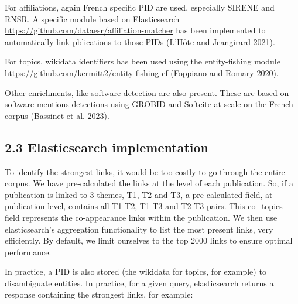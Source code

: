 \documentclass[
]{article}
\begin{document}
For affiliations, again French specific PID are used, especially SIRENE
and RNSR. A specific module based on Elasticsearch
\url{https://github.com/dataesr/affiliation-matcher} has been
implemented to automatically link pblications to those PIDs (L'Hôte and
Jeangirard 2021).

For topics, wikidata identifiers has been used using the entity-fishing
module \url{https://github.com/kermitt2/entity-fishing} cf (Foppiano and
Romary 2020).

Other enrichments, like software detection are also present. These are
based on software mentions detections using GROBID and Softcite at scale
on the French corpus (Bassinet et al. 2023).

\hypertarget{elasticsearch-implementation}{%
\subsection{2.3 Elasticsearch
implementation}\label{elasticsearch-implementation}}

To identify the strongest links, it would be too costly to go through
the entire corpus. We have pre-calculated the links at the level of each
publication. So, if a publication is linked to 3 themes, T1, T2 and T3,
a pre-calculated field, at publication level, contains all T1-T2, T1-T3
and T2-T3 pairs. This co\_topics field represents the co-appearance
links within the publication. We then use elasticsearch's aggregation
functionality to list the most present links, very efficiently. By
default, we limit ourselves to the top 2000 links to ensure optimal
performance.

In practice, a PID is also stored (the wikidata for topics, for example)
to disambiguate entities. In practice, for a given query, elasticsearch
returns a response containing the strongest links, for example:
\end{document}
